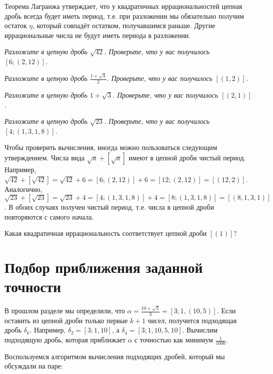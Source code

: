 \documentclass{article}
\newenvironment{exercise}{%
\begin{framed}\par\noindent\slshape%
}%
{\end{framed}}
\begin{document}
Теорема Лагранжа утверждает, что у квадратичных иррациональностей цепная дробь всегда будет иметь период, т.е. при разложении мы обязательно получим остаток $\eta$, который совпадёт остатком, получавшимся раньше. Другие иррациональные числа не будут иметь периода в разложении.

\begin{exercise}%
Разложите в цепную дробь $\sqrt{42}$. Проверьте, что у вас получилось $[6; (2,12)]$.
\end{exercise}

\begin{exercise}%
Разложите в цепную дробь $\frac{1+\sqrt{3}}2$. Проверьте, что у вас получилось $[(1,2)]$.
\end{exercise}

\begin{exercise}%
Разложите в цепную дробь $1+\sqrt{3}$. Проверьте, что у вас получилось $[(2,1)]$.
\end{exercise}

\begin{exercise}%
Разложите в цепную дробь $\sqrt{23}$. Проверьте, что у вас получилось $[4; (1,3,1,8)]$.
\end{exercise}

Чтобы проверить вычисления, иногда можно пользоваться следующим утверждением. Числа вида $\sqrt a + [\sqrt a]$ имеют в цепной дроби чистый период. Например, $\sqrt {42} + [\sqrt {42}]=\sqrt{42}+6=[6; (2,12)] + 6 = [12; (2,12)]=[(12,2)]$. Аналогично, $\sqrt{23}+[\sqrt{23}]=\sqrt{23}+4=[4; (1,3,1,8)]+4=[8; (1,3,1,8)]=[(8,1,3,1)]$. В обоих случаях получен чистый период, т.е. числа в цепной дроби повторяются с самого начала.

\begin{exercise}
Какая квадратичная иррациональность соответствует цепной дроби $[(1)]$?
\end{exercise}

\section{Подбор приближения заданной точности}

В прошлом разделе мы определили, что $\alpha=\frac{10+\sqrt3}{3}=[3;1,(10,5)]$. Если оставить из цепной дроби только первые $k + 1$ чисел, получится подходящая дробь $\delta_k$. Например, $\delta_2=[3;1,10]$, а $\delta_4=[3;1,10,5,10]$. Вычислим подходящую дробь, которая приближает $\alpha$ с точностью как минимум $\frac{1}{1000}$.

Воспользуемся алгоритмом вычисления подходящих дробей, который мы обсуждали на паре:
\end{document}
